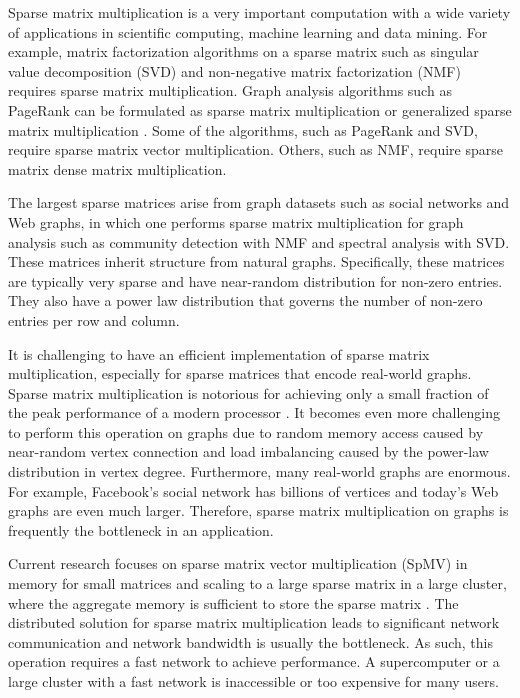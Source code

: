 Sparse matrix multiplication is a very important computation with a wide variety
of applications in scientific computing, machine learning and data mining.
For example, matrix factorization algorithms on a sparse matrix such as
singular value decomposition (SVD) \cite{svd} and non-negative matrix
factorization (NMF) \cite{nmf} requires sparse matrix multiplication.
Graph analysis algorithms such as PageRank \cite{pagerank} can be
formulated as sparse matrix multiplication or generalized sparse matrix
multiplication \cite{Mattson13}. Some of
the algorithms, such as PageRank and SVD, require sparse matrix vector
multiplication. Others, such as NMF, require sparse matrix dense
matrix multiplication.

The largest sparse matrices arise from graph datasets such as social networks
and Web graphs, in which one performs
sparse matrix multiplication for graph analysis such as community detection
with NMF and spectral analysis with SVD. These matrices inherit structure
from natural graphs. Specifically,
these matrices are typically very sparse and have near-random distribution
for non-zero entries. They also have a power law distribution that governs
the number of non-zero entries per row and column.


It is challenging to have an efficient implementation of sparse matrix
multiplication, especially for sparse matrices that encode real-world graphs.
Sparse matrix multiplication is notorious for achieving only
a small fraction of the peak performance of a modern processor \cite{Williams07}.
It becomes even more challenging to perform this operation on graphs due to
random memory access caused by near-random vertex connection and load imbalancing
caused by the power-law distribution in vertex degree. Furthermore, many
real-world graphs
are enormous. For example, Facebook's social network has billions of vertices
and today's Web graphs are even much larger. %
Therefore, sparse matrix multiplication on graphs is frequently the bottleneck
in an application.

Current research focuses on sparse matrix vector multiplication (SpMV) in memory
for small matrices and scaling to a large sparse matrix in a large cluster,
where the aggregate memory is sufficient to store the sparse matrix
\cite{Williams07, Yoo11, Boman2013}.
The distributed solution for sparse matrix multiplication leads to significant
network communication and network bandwidth is usually the bottleneck.
As such, this operation requires a fast network to achieve performance.
A supercomputer or a large cluster with a fast network is inaccessible or
too expensive for many users.

